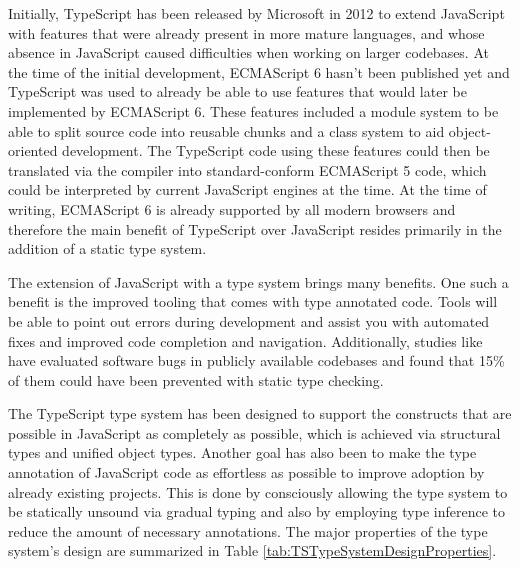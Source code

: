 Initially, TypeScript has been released by Microsoft in 2012 \parencite{TSFirstRelease} to extend JavaScript with features that were already present in more mature languages, and whose absence in JavaScript caused difficulties when working on larger codebases. At the time of the initial development, ECMAScript 6 hasn't been published yet and TypeScript was used to already be able to use features that would later be implemented by ECMAScript 6. These features included a module system to be able to split source code into reusable chunks and a class system to aid object-oriented development. The TypeScript code using these features could then be translated via the compiler into standard-conform ECMAScript 5 code, which could be interpreted by current JavaScript engines at the time. At the time of writing, ECMAScript 6 is already supported by all modern browsers and therefore the main benefit of TypeScript over JavaScript resides primarily in the addition of a static type system.

The extension of JavaScript with a type system brings many benefits. One such a benefit is the improved tooling that comes with type annotated code. Tools will be able to point out errors during development and assist you with automated fixes and improved code completion and navigation. Additionally, studies like \cite{ToTypeOrNotToType} have evaluated software bugs in publicly available codebases and found that 15\% of them could have been prevented with static type checking.

The TypeScript type system has been designed to support the constructs that are possible in JavaScript as completely as possible, which is achieved via structural types and unified object types. Another goal has also been to make the type annotation of JavaScript code as effortless as possible to improve adoption by already existing projects. This is done by consciously allowing the type system to be statically unsound via gradual typing and also by employing type inference to reduce the amount of necessary annotations. The major properties of the type system's design are summarized in Table \ref{tab:TSTypeSystemDesignProperties}.

